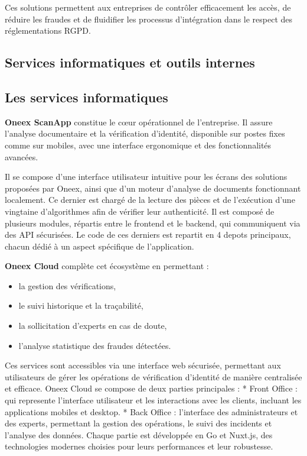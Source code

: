 Ces solutions permettent aux entreprises de contrôler efficacement les accès, de réduire les fraudes et de fluidifier les processus d’intégration dans le respect des réglementations RGPD.

\subsection{Services informatiques et outils internes}

\subsection{Les services informatiques}

\textbf{Oneex ScanApp} constitue le cœur opérationnel de l’entreprise. Il assure l’analyse documentaire et la vérification d’identité, disponible sur postes fixes comme sur mobiles, avec une interface ergonomique et des fonctionnalités avancées.

Il se compose d’une interface utilisateur intuitive pour les écrans des solutions proposées par Oneex, ainsi que d’un moteur d’analyse de documents fonctionnant localement. Ce dernier est chargé de la lecture des pièces et de l’exécution d’une vingtaine d’algorithmes afin de vérifier leur authenticité.
Il est composé de plusieurs modules, répartis entre le frontend et le backend, qui communiquent via des API sécurisées.
Le code de ces derniers est repartit en 4 depots principaux, chacun dédié à un aspect spécifique de l'application.

\textbf{Oneex Cloud} complète cet écosystème en permettant :

\begin{itemize}
	\item la gestion des vérifications,
	\item le suivi historique et la traçabilité,
	\item la sollicitation d’experts en cas de doute,
	\item l’analyse statistique des fraudes détectées.
\end{itemize}

Ces services sont accessibles via une interface web sécurisée, permettant aux utilisateurs de gérer les opérations de vérification d’identité de manière centralisée et efficace.
Oneex Cloud se compose de deux parties principales :
* Front Office : qui represente l'interface utilisateur et les interactions avec les clients, incluant les applications mobiles et desktop.
* Back Office : l'interface des administrateurs et des experts, permettant la gestion des opérations, le suivi des incidents et l'analyse des données.
Chaque partie est développée en Go et Nuxt.js, des technologies modernes choisies pour leurs performances et leur robustesse.

